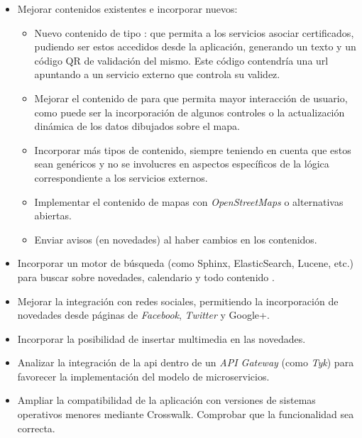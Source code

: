 \begin{itemize}
\item Mejorar contenidos existentes e incorporar nuevos:
\begin{itemize}
\item Nuevo contenido de tipo : que permita a los servicios asociar certificados, pudiendo ser estos accedidos desde la aplicación, generando un texto y un código QR de validación del mismo. Este código contendría una \gls{url} apuntando a un servicio externo que controla su validez. 
\item Mejorar el contenido de  para que permita mayor interacción de usuario, como puede ser la incorporación de algunos controles o la actualización dinámica de los datos dibujados sobre el mapa.
\item Incorporar más tipos de contenido, siempre teniendo en cuenta que estos sean genéricos y no se involucres en aspectos específicos de la lógica correspondiente a los servicios externos.
\item Implementar el contenido de mapas con \textit{OpenStreetMaps} o alternativas abiertas.
\item Enviar avisos (en novedades) al haber cambios en los contenidos.
\end{itemize}
\item Incorporar un motor de búsqueda (como Sphinx, ElasticSearch, Lucene, etc.) para buscar sobre novedades, calendario y todo contenido .
\item Mejorar la integración con redes sociales, permitiendo la incorporación de novedades desde páginas de \textit{Facebook}, \textit{Twitter} y Google+.
\item Incorporar la posibilidad de insertar multimedia en las novedades.
\item Analizar la integración de la \gls{api} dentro de un \textit{API Gateway} (como \textit{Tyk}) para favorecer la implementación del modelo de microservicios.
\item Ampliar la compatibilidad de la aplicación con versiones de sistemas operativos menores mediante Crosswalk. Comprobar que la funcionalidad sea correcta.
\end{itemize}